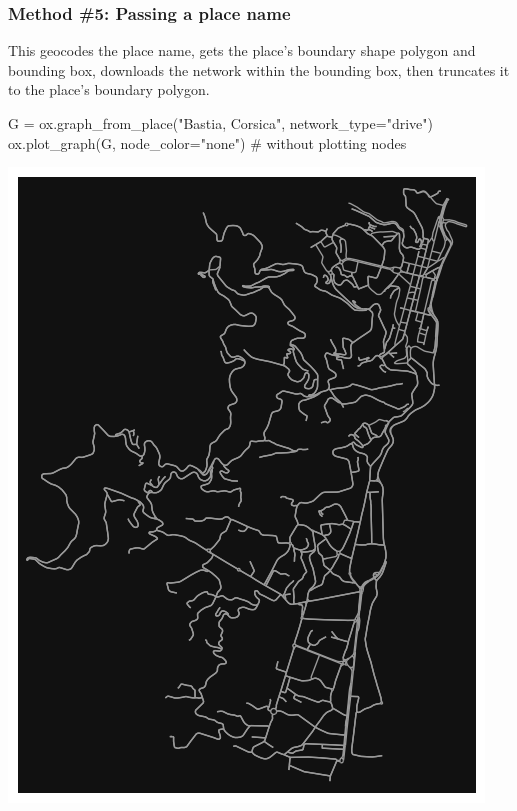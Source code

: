 \documentclass[
  letterpaper,
  DIV=11,
  numbers=noendperiod]{scrreprt}
\newenvironment{Shaded}{\begin{snugshade}}{\end{snugshade}}
\newcommand{\CommentTok}[1]{\textcolor[rgb]{0.37,0.37,0.37}{#1}}
\newcommand{\NormalTok}[1]{\textcolor[rgb]{0.00,0.23,0.31}{#1}}
\newcommand{\OperatorTok}[1]{\textcolor[rgb]{0.37,0.37,0.37}{#1}}
\newcommand{\StringTok}[1]{\textcolor[rgb]{0.13,0.47,0.30}{#1}}
\begin{document}
\subsubsection{Method \#5: Passing a place
name}\label{method-5-passing-a-place-name}

This geocodes the place name, gets the place's boundary shape polygon
and bounding box, downloads the network within the bounding box, then
truncates it to the place's boundary polygon.

\begin{Shaded}
\begin{Highlighting}[]
\NormalTok{G }\OperatorTok{=}\NormalTok{ ox.graph\_from\_place(}\StringTok{"Bastia, Corsica"}\NormalTok{, network\_type}\OperatorTok{=}\StringTok{"drive"}\NormalTok{)}
\NormalTok{ox.plot\_graph(G, node\_color}\OperatorTok{=}\StringTok{"none"}\NormalTok{) }\CommentTok{\# without plotting nodes}
\end{Highlighting}
\end{Shaded}

\includegraphics{labs/w07_OSM_files/figure-pdf/cell-11-output-1.png}
\end{document}
